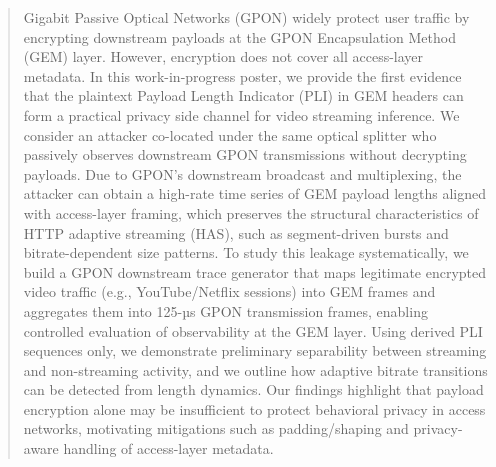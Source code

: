 \documentclass[conference]{IEEEtran}
\begin{document}
\maketitle

\begin{abstract}
Gigabit Passive Optical Networks (GPON) widely protect user traffic by encrypting downstream payloads at the GPON Encapsulation Method (GEM) layer. However, encryption does not cover all access-layer metadata. In this work-in-progress poster, we provide the first evidence that the plaintext Payload Length Indicator (PLI) in GEM headers can form a practical privacy side channel for video streaming inference. We consider an attacker co-located under the same optical splitter who passively observes downstream GPON transmissions without decrypting payloads. Due to GPON’s downstream broadcast and multiplexing, the attacker can obtain a high-rate time series of GEM payload lengths aligned with access-layer framing, which preserves the structural characteristics of HTTP adaptive streaming (HAS), such as segment-driven bursts and bitrate-dependent size patterns.
To study this leakage systematically, we build a GPON downstream trace generator that maps legitimate encrypted video traffic (e.g., YouTube/Netflix sessions) into GEM frames and aggregates them into 125-µs GPON transmission frames, enabling controlled evaluation of observability at the GEM layer. Using derived PLI sequences only, we demonstrate preliminary separability between streaming and non-streaming activity, and we outline how adaptive bitrate transitions can be detected from length dynamics. Our findings highlight that payload encryption alone may be insufficient to protect behavioral privacy in access networks, motivating mitigations such as padding/shaping and privacy-aware handling of access-layer metadata.
\end{abstract}





%
\IEEEpeerreviewmaketitle
\end{document}
